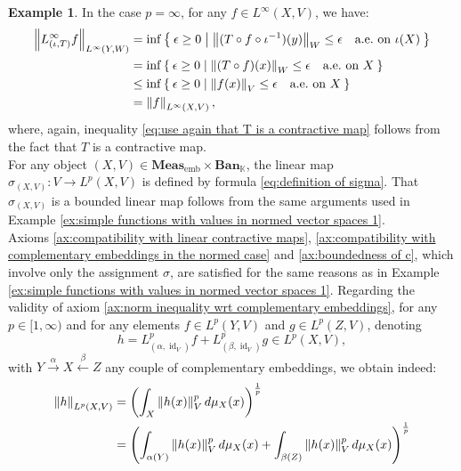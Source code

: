 \documentclass{amsart}
\theoremstyle{definition}
\newtheorem{example}[definition]{Example}
\theoremstyle{plain}
\newcommand{\norm}[1]{\left\lVert #1\right\rVert} %
\newcommand{\id}{\operatorname{id}}
\newcommand{\embMeas}{\mathbf{Meas}_\mathrm{emb}}
\newcommand{\Ban}{\mathbf{Ban}_{\mathbb{K}}}
\begin{document}
\begin{example}
            In the case $p = \infty$, for any $f \in L^\infty(X,V)$, we have:
            \begin{align}
                \norm{L^\infty_{(\iota,T)} f}_{L^\infty(Y,W)} &= \inf \Set{\epsilon \geq 0 | \norm{(T \circ f \circ \iota^{-1})(y)}_W \leq \epsilon \quad \text{a.e.~on} ~ \iota(X)} \notag \\
                &= \inf \Set{\epsilon \geq 0 | \norm{(T \circ f)(x)}_W \leq \epsilon \quad \text{a.e.~on} ~ X} \notag \\
                &\leq \inf \Set{\epsilon \geq 0 | \norm{f(x)}_V \leq \epsilon \quad \text{a.e.~on} ~ X} \label{eq:use again that T is a contractive map} \\
                &= \norm{f}_{L^\infty(X,V)}, \notag
            \end{align}
            where, again, inequality \eqref{eq:use again that T is a contractive map} follows from the fact that $T$ is a contractive map. \\
            For any object $(X,V) \in \embMeas \times \Ban$, the linear map $\sigma_{(X,V)} \colon V \rightarrow L^p(X,V)$ is defined by formula \eqref{eq:definition of sigma}. 
            That $\sigma_{(X,V)}$ is a bounded linear map follows from the same arguments used in Example \ref{ex:simple functions with values in normed vector spaces 1}. \\
            Axioms \eqref{ax:compatibility with linear contractive maps}, \eqref{ax:compatibility with complementary embeddings in the normed case} and \eqref{ax:boundedness of c}, which involve only the assignment $\sigma$, are satisfied for the same reasons as in Example \ref{ex:simple functions with values in normed vector spaces 1}.
            Regarding the validity of axiom \eqref{ax:norm inequality wrt complementary embeddings}, for any $p \in [1,\infty)$ and for any elements $f \in L^p{(Y,V)}$ and $g \in L^p{(Z,V)}$, denoting 
            \begin{equation*}
                h = L^p_{(\alpha,\id_V)}f + L^p_{(\beta,\id_V)}g \in L^p{(X,V)},
            \end{equation*}
            with $Y \xrightarrow{~\alpha~} X \xleftarrow{~\beta~} Z$ any couple of complementary embeddings, we obtain indeed:
            \begin{align}
                \norm{h}_{L^p(X,V)} &= \left( \int_{X} \norm{h(x)}_V^p d\mu_{X}(x) \right)^{\frac{1}{p}} \notag \\
                &= \left( \int_{\alpha(Y)} \norm{h(x)}_V^p d\mu_{X}(x) + \int_{\beta(Z)} \norm{h(x)}_V^p d\mu_{X}(x) \right)^{\frac{1}{p}} \label{eq:use additivity of the Bochner integral} \\

\end{align}
\end{example}
\end{document}
